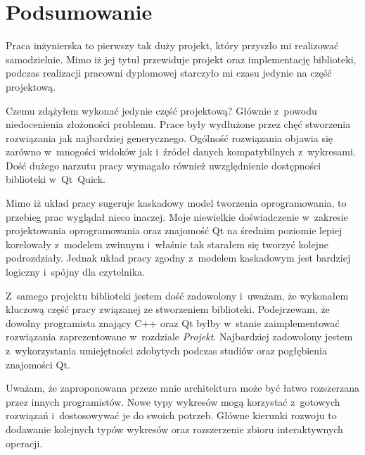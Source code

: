 \chapter{Podsumowanie}
Praca inżynierska to pierwszy tak duży projekt, który przyszło mi realizować samodzielnie. Mimo iż jej tytuł przewiduje projekt oraz implementację biblioteki, podczas realizacji pracowni dyplomowej starczyło mi czasu jedynie na część projektową.

Czemu zdążyłem wykonać jedynie część projektową? Głównie z~powodu niedocenienia złożoności problemu. Prace były wydłużone przez chęć stworzenia rozwiązania jak najbardziej generycznego. Ogólność rozwiązania objawia się zarówno w~mnogości widoków jak i~źródeł danych kompatybilnych z~wykresami. Dość dużego narzutu pracy wymagało również uwzględnienie dostępności biblioteki w~Qt~Quick.

Mimo iż układ pracy sugeruje kaskadowy model tworzenia oprogramowania, to przebieg prac wyglądał nieco inaczej. Moje niewielkie doświadczenie w~zakresie projektowania oprogramowania oraz znajomość Qt na średnim poziomie lepiej korelowały z~modelem zwinnym i~właśnie tak starałem się tworzyć kolejne podrozdziały. Jednak układ pracy zgodny z~modelem kaskadowym jest bardziej logiczny i~spójny dla czytelnika.

Z~samego projektu biblioteki jestem dość zadowolony i~uważam, że wykonałem kluczową część pracy związanej ze stworzeniem biblioteki. Podejrzewam, że dowolny programista znający C++ oraz Qt byłby w~stanie zaimplementować rozwiązania zaprezentowane w~rozdziale \textit{Projekt}. Najbardziej zadowolony jestem z~wykorzystania umiejętności zdobytych podczas studiów oraz pogłębienia znajomości Qt.

Uważam, że zaproponowana przeze mnie architektura może być łatwo rozszerzana przez innych programistów. Nowe typy wykresów mogą korzystać z~gotowych rozwiązań i~dostosowywać je do swoich potrzeb. Główne kierunki rozwoju to dodawanie kolejnych typów wykresów oraz rozszerzenie zbioru interaktywnych operacji.

